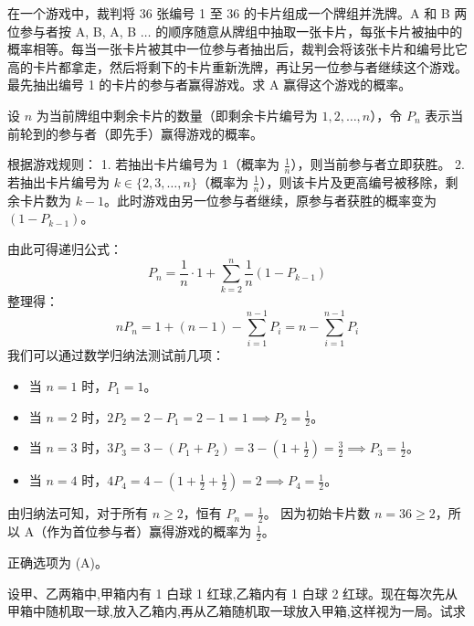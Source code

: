 \begin{questions}
    \question 在一个游戏中，裁判将 36 张编号 1 至 36 的卡片组成一个牌组并洗牌。A 和 B 两位参与者按 A, B, A, B $\dots$ 的顺序随意从牌组中抽取一张卡片，每张卡片被抽中的概率相等。每当一张卡片被其中一位参与者抽出后，裁判会将该张卡片和编号比它高的卡片都拿走，然后将剩下的卡片重新洗牌，再让另一位参与者继续这个游戏。最先抽出编号 1 的卡片的参与者赢得游戏。求 A 赢得这个游戏的概率。

\begin{solution}
设 $n$ 为当前牌组中剩余卡片的数量（即剩余卡片编号为 $1, 2, \dots, n$），令 $P_n$ 表示当前轮到的参与者（即先手）赢得游戏的概率。

根据游戏规则：
1. 若抽出卡片编号为 1（概率为 $\frac{1}{n}$），则当前参与者立即获胜。
2. 若抽出卡片编号为 $k \in \{2, 3, \dots, n\}$（概率为 $\frac{1}{n}$），则该卡片及更高编号被移除，剩余卡片数为 $k-1$。此时游戏由另一位参与者继续，原参与者获胜的概率变为 $(1 - P_{k-1})$。

由此可得递归公式：
\[
P_n = \frac{1}{n} \cdot 1 + \sum_{k=2}^{n} \frac{1}{n} (1 - P_{k-1})
\]
整理得：
\[
n P_n = 1 + (n-1) - \sum_{i=1}^{n-1} P_i = n - \sum_{i=1}^{n-1} P_i
\]
我们可以通过数学归纳法测试前几项：
\begin{itemize}
    \item 当 $n=1$ 时，$P_1 = 1$。
    \item 当 $n=2$ 时，$2P_2 = 2 - P_1 = 2 - 1 = 1 \implies P_2 = \frac{1}{2}$。
    \item 当 $n=3$ 时，$3P_3 = 3 - (P_1 + P_2) = 3 - (1 + \frac{1}{2}) = \frac{3}{2} \implies P_3 = \frac{1}{2}$。
    \item 当 $n=4$ 时，$4P_4 = 4 - (1 + \frac{1}{2} + \frac{1}{2}) = 2 \implies P_4 = \frac{1}{2}$。
\end{itemize}
由归纳法可知，对于所有 $n \ge 2$，恒有 $P_n = \frac{1}{2}$。
因为初始卡片数 $n = 36 \ge 2$，所以 A（作为首位参与者）赢得游戏的概率为 $\frac{1}{2}$。

正确选项为 (A)。
\end{solution}

    \question 设甲、乙两箱中,甲箱内有 1 白球 1 红球,乙箱内有 1 白球 2 红球。现在每次先从甲箱中随机取一球,放入乙箱内,再从乙箱随机取一球放入甲箱,这样视为一局。试求  
    \begin{parts}

\end{parts}
\end{questions}
